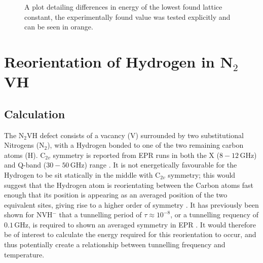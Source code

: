 \documentclass[10pt,a4paper,twocolumn,twoside]{extarticle}
\newcommand{\ntvh}{N$_2$VH}
\begin{document}
\begin{figure}
		\resizebox{\columnwidth}{!}{%
		
		}
	\caption{A plot detailing differences in energy of the lowest found lattice constant, the experimentally found value was tested explicitly and can be seen in orange.}
	\label{fig:conv}
\end{figure}

\section{Reorientation of Hydrogen in N$_2$VH}
\label{n2vh}
\subsection{Calculation}
\label{n2vh_calc}
The {\ntvh} defect consists of a vacancy (V) surrounded by two substitutional Nitrogens (N$_2$), with a Hydrogen bonded to one of the two remaining carbon atoms (H). C$_{2v}$ symmetry is reported from EPR runs in both the X ($8-12$\,GHz) and Q-band ($30-50$\,GHz) range \cite{Hartland}. It is not energetically favourable for the Hydrogen to be sit statically in the middle with C$_{2v}$ symmetry; this would suggest that the Hydrogen atom is reorientating between the Carbon atoms fast enough that its position is appearing as an averaged position of the two equivalent sites, giving rise to a higher order of symmetry \cite{Shaw_QT_VH}. 
It has previously been shown for NVH$^-$ that a tunnelling period of $\tau \approx 10^{-8}$, or a tunnelling requency of $0.1$\,GHz, is required to shown an averaged symmetry in EPR \cite{Edwards_N2VH_rate}. It would therefore be of interest to calculate the energy required for this reorientation to occur, and thus potentially create a relationship between tunnelling frequency and temperature. 
\end{document}
